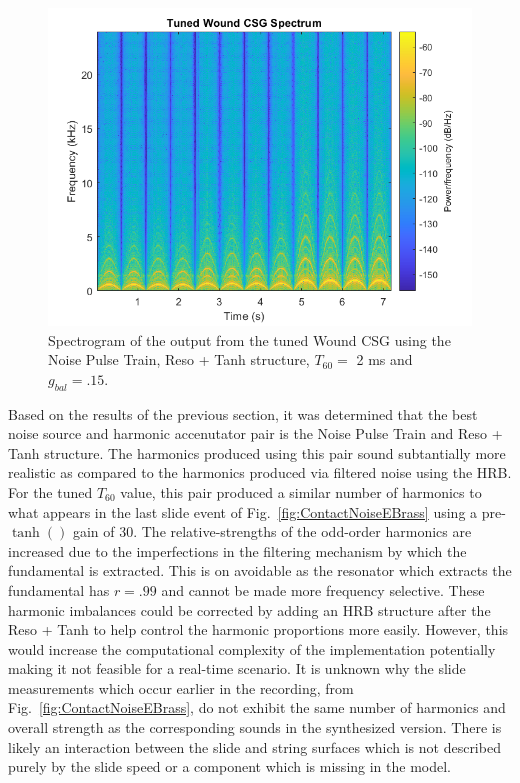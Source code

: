 \documentclass[../main.tex]{subfiles}
\begin{document}
\begin{figure}[h]
    \centering
    \includegraphics[scale=.65]{./images/plots/TunedWoundCSG.png}
    \caption{Spectrogram of the output from the tuned Wound CSG using the Noise Pulse Train, Reso + Tanh structure, $T_{60} = $ 2 ms and $g_{bal} = .15$.}
    \label{fig:TunedWoundCSG}
\end{figure}

Based on the results of the previous section, it was determined that the best noise source and harmonic accenutator pair is the Noise Pulse Train and Reso + Tanh structure. The harmonics produced using this pair sound subtantially more realistic as compared to the harmonics produced via filtered noise using the HRB. For the tuned $T_{60}$ value, this pair produced a similar number of harmonics to what appears in the last slide event of Fig.~\ref{fig:ContactNoiseEBrass} using a pre-$\tanh()$ gain of 30. The relative-strengths of the odd-order harmonics are increased due to the imperfections in the filtering mechanism by which the fundamental is extracted. This is on avoidable as the resonator which extracts the fundamental has $r = .99$ and cannot be made more frequency selective. These harmonic imbalances could be corrected by adding an HRB structure after the Reso + Tanh to help control the harmonic proportions more easily. However, this would increase the computational complexity of the implementation potentially making it not feasible for a real-time scenario. It is unknown why the slide measurements which occur earlier in the recording, from Fig.~\ref{fig:ContactNoiseEBrass}, do not exhibit the same number of harmonics and overall strength as the corresponding sounds in the synthesized version. There is likely an interaction between the slide and string surfaces which is not described purely by the slide speed or a component which is missing in the model.
\end{document}
